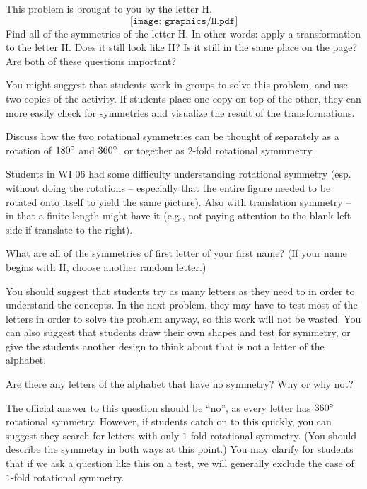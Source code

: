 \documentclass{ximera}
\begin{document}
\begin{problem}
This problem is brought to you by the letter H.
\[
\texttt{[image: graphics/H.pdf]}
\]
Find all of the symmetries of the letter H.  In other words: apply a transformation to the letter H.  Does it still look like H?  Is it still in the same place on the page?  Are both of these questions important?

\begin{instructorNotes}
You might suggest that students work in groups to solve this problem, and use two copies of the activity.  If students place one copy on top of the other, they can more easily check for symmetries and visualize the result of the transformations.

Discuss how the two rotational symmetries can be thought of separately as a rotation of $180\degree$ and $360\degree$, or together as $2$-fold rotational symmmetry. 

Students in WI 06 had some difficulty understanding rotational symmetry (esp. without doing the rotations -- especially that the entire figure needed to be rotated onto itself to yield the same picture).  Also with translation symmetry -- in that a finite length might have it (e.g., not paying attention to the blank left side if translate to the right).
\end{instructorNotes}
\end{problem}

\begin{problem}
What are all of the symmetries of first letter of your first name?  (If your name begins with H, choose another random letter.)

\begin{instructorNotes}
You should suggest that students try as many letters as they need to in order to understand the concepts.  In the next problem, they may have to test most of the letters in order to solve the problem anyway, so this work will not be wasted.  You can also suggest that students draw their own shapes and test for symmetry, or give the students another design to think about that is not a letter of the alphabet.
\end{instructorNotes}
\end{problem}

\begin{problem}
Are there any letters of the alphabet that have no symmetry?  Why or why not?
\begin{instructorNotes}
The official answer to this question should be ``no'', as every letter has $360\degree$ rotational symmetry.  However, if students catch on to this quickly, you can suggest they search for letters with only $1$-fold rotational symmetry.  (You should describe the symmetry in both ways at this point.)  You may clarify for students that if we ask a question like this on a test, we will generally exclude the case of $1$-fold rotational symmetry.
\end{instructorNotes}
\end{problem}
\end{document}
